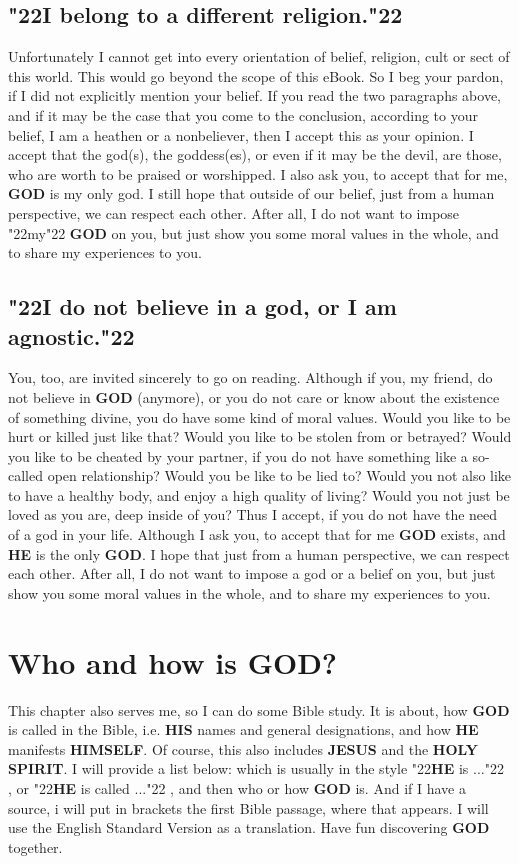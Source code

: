 \documentclass[10pt,a5paper]{article}
\newcommand{\God}[0]{\textbf{GOD}}
\newcommand{\He}[0]{\textbf{HE}}
\newcommand{\Himself}[0]{\textbf{HIMSELF}}
\newcommand{\His}[0]{\textbf{HIS}}
\newcommand{\Holy}[0]{\textbf{HOLY}}
\newcommand{\Jesus}[0]{\textbf{JESUS}}
\newcommand{\Spirit}[0]{\textbf{SPIRIT}}
\newcommand{\q}[1]{\char"22{#1}\char"22 }
\begin{document}
	\subsection{\q{I belong to a different religion.}}
		Unfortunately I cannot get into every orientation of belief,
		religion, cult or sect of this world.
		This would go beyond the scope of this eBook.
		So I beg your pardon,
		if I did not explicitly mention your belief.
		If you read the two paragraphs above,
		and if it may be the case that you come to the conclusion,
		according to your belief,
		I am a heathen or a nonbeliever,
		then I accept this as your opinion.
		I accept that the god(s),
		the goddess(es),
		or even if it may be the devil,
		are those,
		who are worth to be praised or worshipped.
		I also ask you,
		to accept that for me,
		{\God} is my only god.
		I still hope that outside of our belief,
		just from a human perspective,
		we can respect each other.
		After all,
		I do not want to impose \q{my} {\God} on you,
		but just show you some moral values in the whole,
		and to share my experiences to you.
		
	\subsection{\q{I do not believe in a god, or I am agnostic.}}
		You,
		too,
		are invited sincerely to go on reading.
		Although if you,
		my friend,
		do not believe in {\God} (anymore),
		or you do not care or know about the existence of something divine,
		you do have some kind of moral values.
		Would you like to be hurt or killed just like that?
		Would you like to be stolen from or betrayed?
		Would you like to be cheated by your partner,
		if you do not have something like a so-called open relationship?
		Would you be like to be lied to?
		Would you not also like to have a healthy body,
		and enjoy a high quality of living?
		Would you not just be loved as you are,
		deep inside of you?
		Thus I accept,
		if you do not have the need of a god in your life.
		Although I ask you,
		to accept that for me {\God} exists,
		and {\He} is the only {\God}.
		I hope that just from a human perspective,
		we can respect each other.
		After all,
		I do not want to impose a god or a belief on you,
		but just show you some moral values in the whole,
		and to share my experiences to you.

	\newpage
	\section{Who and how is {\God}?}
		This chapter also serves me,
		so I can do some Bible study.
		It is about,
		how {\God} is called in the Bible,
		i.e. {\His} names and general designations,
		and how {\He} manifests {\Himself}.
		Of course,
		this also includes {\Jesus} and the {\Holy} {\Spirit}.
		I will provide a list below:
		which is usually in the style \q{{\He} is ...},
		or \q{{\He} is called ...},
		and then who or how {\God} is.
		And if I have a source,
		i will put in brackets the first Bible passage,
		where that appears.
		I will use the English Standard Version as a translation.
		Have fun discovering {\God} together.
\end{document}
